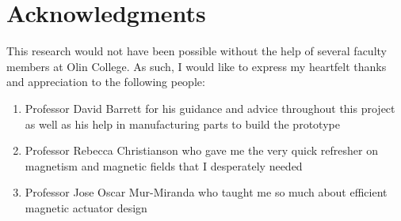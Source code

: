 \section{Acknowledgments}
\vspace{0.5in}
This research would not have been possible without the help of several faculty members at Olin College. As such, I would like to express my heartfelt thanks and appreciation to the following people:

\begin{enumerate}
\item Professor David Barrett for his guidance and advice throughout this project as well as his help in manufacturing parts to build the prototype
\item Professor Rebecca Christianson who gave me the very quick refresher on magnetism and magnetic fields that I desperately needed
\item Professor Jose Oscar Mur-Miranda who taught me so much about efficient magnetic actuator design

\end{enumerate}

\newpage
